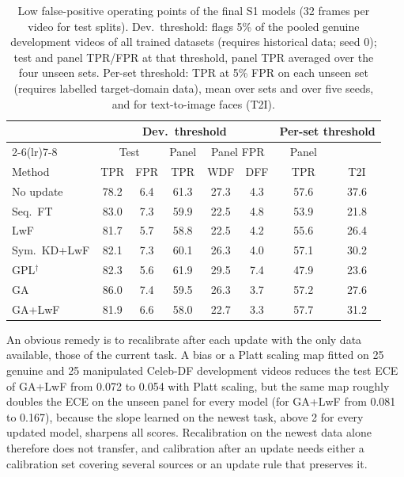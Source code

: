 \documentclass[journal]{IEEEtran}
\begin{document}
\begin{table}[t]
\caption{Low false-positive operating points of the final S1 models (32 frames per video for test splits). Dev.\ threshold: flags 5\% of the pooled genuine development videos of all trained datasets (requires historical data; seed 0); test and panel TPR/FPR at that threshold, panel TPR averaged over the four unseen sets. Per-set threshold: TPR at 5\% FPR on each unseen set (requires labelled target-domain data), mean over sets and over five seeds, and for text-to-image faces (T2I).}
\label{tab:oppoint}
\centering
\footnotesize
\setlength{\tabcolsep}{2.0pt}
\begin{tabular}{@{}lccccccc@{}}
\toprule
& \multicolumn{5}{c}{Dev.\ threshold} & \multicolumn{2}{c}{Per-set threshold} \\
\cmidrule(lr){2-6}\cmidrule(lr){7-8}
& \multicolumn{2}{c}{Test} & Panel & \multicolumn{2}{c}{Panel FPR} & Panel & \\
Method & TPR & FPR & TPR & WDF & DFF & TPR & T2I \\
\midrule
No update & 78.2 & 6.4 & 61.3 & 27.3 & 4.3 & 57.6 & 37.6 \\
Seq.\ FT & 83.0 & 7.3 & 59.9 & 22.5 & 4.8 & 53.9 & 21.8 \\
LwF & 81.7 & 5.7 & 58.8 & 22.5 & 4.2 & 55.6 & 26.4 \\
Sym.\ KD+LwF & 82.1 & 7.3 & 60.1 & 26.3 & 4.0 & 57.1 & 30.2 \\
GPL$^\dagger$ & 82.3 & 5.6 & 61.9 & 29.5 & 7.4 & 47.9 & 23.6 \\
GA & 86.0 & 7.4 & 59.5 & 26.3 & 3.7 & 57.2 & 27.6 \\
GA+LwF & 81.9 & 6.6 & 58.0 & 22.7 & 3.3 & 57.7 & 31.2 \\
\bottomrule
\end{tabular}
\end{table}

An obvious remedy is to recalibrate after each update with the only data available, those of the current task. A bias or a Platt scaling map fitted on 25 genuine and 25 manipulated Celeb-DF development videos reduces the test ECE of GA+LwF from 0.072 to 0.054 with Platt scaling, but the same map roughly doubles the ECE on the unseen panel for every model (for GA+LwF from 0.081 to 0.167), because the slope learned on the newest task, above 2 for every updated model, sharpens all scores. Recalibration on the newest data alone therefore does not transfer, and calibration after an update needs either a calibration set covering several sources or an update rule that preserves it.
\end{document}

